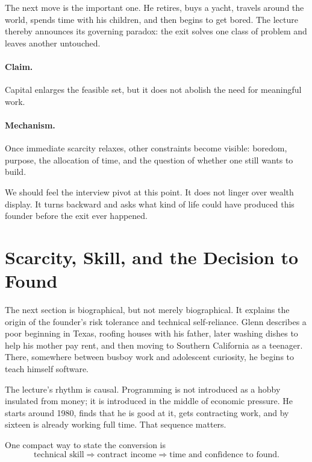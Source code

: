 The next move is the important one. He retires, buys a yacht, travels around the world, spends time with his children, and then begins to get bored. The lecture thereby announces its governing paradox: the exit solves one class of problem and leaves another untouched.

\paragraph{Claim.} Capital enlarges the feasible set, but it does not abolish the need for meaningful work.

\paragraph{Mechanism.} Once immediate scarcity relaxes, other constraints become visible: boredom, purpose, the allocation of time, and the question of whether one still wants to build.

We should feel the interview pivot at this point. It does not linger over wealth display. It turns backward and asks what kind of life could have produced this founder before the exit ever happened.

\section{Scarcity, Skill, and the Decision to Found}

The next section is biographical, but not merely biographical. It explains the origin of the founder's risk tolerance and technical self-reliance. Glenn describes a poor beginning in Texas, roofing houses with his father, later washing dishes to help his mother pay rent, and then moving to Southern California as a teenager. There, somewhere between busboy work and adolescent curiosity, he begins to teach himself software.

The lecture's rhythm is causal. Programming is not introduced as a hobby insulated from money; it is introduced in the middle of economic pressure. He starts around 1980, finds that he is good at it, gets contracting work, and by sixteen is already working full time. That sequence matters.

One compact way to state the conversion is
\begin{equation}
\text{technical skill} \Longrightarrow \text{contract income} \Longrightarrow \text{time and confidence to found.}
\end{equation}

